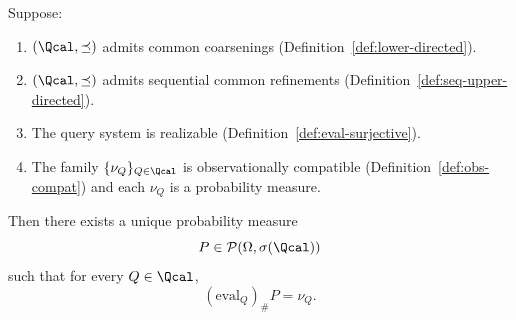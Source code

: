 \begin{theorem}
\label{thm:obs-extension}
Suppose:
\begin{enumerate}
\item $(\Qcal,\preceq)$ admits common coarsenings
      (Definition~\ref{def:lower-directed}).
\item $(\Qcal,\preceq)$ admits sequential common refinements
      (Definition~\ref{def:seq-upper-directed}).
\item The query system is realizable
      (Definition~\ref{def:eval-surjective}).
\item The family $\{\nu_Q\}_{Q\in\Qcal}$ is observationally compatible
      (Definition~\ref{def:obs-compat}) and each $\nu_Q$ is a
      probability measure.
\end{enumerate}
Then there exists a unique probability measure
\[
P \in \mathcal P(\Omega,\sigma(\Qcal))
\]
such that for every $Q\in\Qcal$,
\[
(\mathrm{eval}_Q)_\# P = \nu_Q.
\]
\end{theorem}

